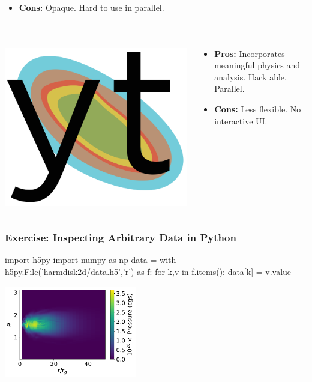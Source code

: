 \documentclass[]{beamer}
\begin{document}
\begin{frame}
\begin{columns}
\begin{column}{6cm}
\begin{itemize}
      \item \textbf{\color{red}Cons:} Opaque. Hard to use in parallel.
      \end{itemize}
    \end{column}
  \end{columns}
  \noindent\rule{\textwidth}{1pt}
  \begin{columns}
    \begin{column}{6cm}
      \begin{center}
        \includegraphics[width=0.4\columnwidth]{figures/yt_logo}
      \end{center}
    \end{column}
    \begin{column}{6cm}
      \begin{itemize}
      \item \textbf{\color{green}Pros:} Incorporates meaningful
        physics and analysis. Hack able. Parallel.
      \item \textbf{\color{red}Cons:} Less flexible. No interactive UI.
      \end{itemize}
    \end{column}
  \end{columns}
\end{frame}

\begin{frame}[fragile]
  \frametitle{Exercise: Inspecting Arbitrary Data in Python}
\begin{python}
import h5py
import numpy as np
data = {}
with h5py.File('harmdisk2d/data.h5','r') as f:
    for k,v in f.items():
        data[k] = v.value
\end{python}
  \begin{center}
    \includegraphics[height=4cm]{figures/harmdisk2d}
  \end{center}
\end{frame}
\end{document}
